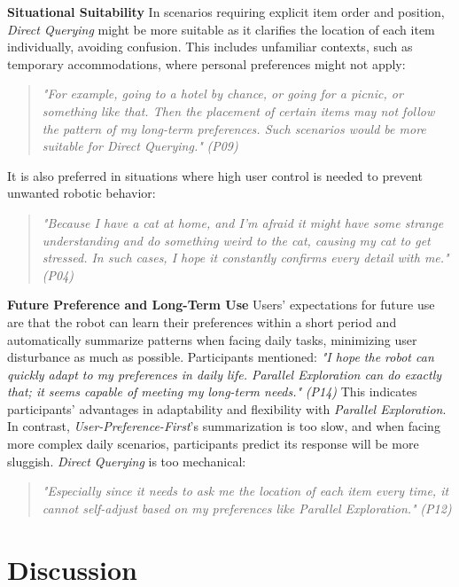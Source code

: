 \documentclass[sigconf,authordraft]{acmart}
\newcommand{\smallitalic}[1]{{\small\textit{#1}}}
\newcommand{\strategy}[1]{{\textit{#1}}}
\begin{document}
\textbf{Situational Suitability}
In scenarios requiring explicit item order and position, \strategy{Direct Querying} might be more suitable as it clarifies the location of each item individually, avoiding confusion. This includes unfamiliar contexts, such as temporary accommodations, where personal preferences might not apply:
\begin{quote}
\smallitalic{"For example, going to a hotel by chance, or going for a picnic, or something like that. Then the placement of certain items may not follow the pattern of my long-term preferences. Such scenarios would be more suitable for Direct Querying."} \smallitalic{(P09)}
\end{quote}
It is also preferred in situations where high user control is needed to prevent unwanted robotic behavior:
\begin{quote}
\smallitalic{"Because I have a cat at home, and I'm afraid it might have some strange understanding and do something weird to the cat, causing my cat to get stressed. In such cases, I hope it constantly confirms every detail with me."} \smallitalic{(P04)}
\end{quote}

\textbf{Future Preference and Long-Term Use}
Users' expectations for future use are that the robot can learn their preferences within a short period and automatically summarize patterns when facing daily tasks, minimizing user disturbance as much as possible. Participants mentioned: \smallitalic{"I hope the robot can quickly adapt to my preferences in daily life. Parallel Exploration can do exactly that; it seems capable of meeting my long-term needs."} \smallitalic{(P14)} This indicates participants' advantages in adaptability and flexibility with \strategy{Parallel Exploration}. In contrast, \strategy{User-Preference-First}'s summarization is too slow, and when facing more complex daily scenarios, participants predict its response will be more sluggish. \strategy{Direct Querying} is too mechanical:
\begin{quote}
\smallitalic{"Especially since it needs to ask me the location of each item every time, it cannot self-adjust based on my preferences like Parallel Exploration."} \smallitalic{(P12)}
\end{quote}





\section{Discussion}
\end{document}
